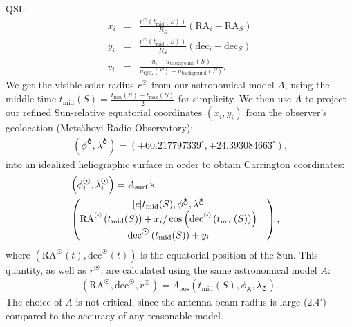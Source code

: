 \documentclass{aa}
\newcommand{\arrc}[1]{\begin{matrix}[c] #1 \end{matrix}}
\newcommand{\eqnl}[2]{\begin{eqnarray}\label{#1}#2\end{eqnarray}}
\newcommand{\s}[2]{{#1}_{\mathrm{#2}}}
\begin{document}
QSL:
\eqnl{calibration}{
x_i &=& \frac{r^{\astrosun} \left( \s{t}{mid}(S) \right)}{R_S} \left( \mathrm{RA}_i -  \mathrm{RA}_S  \right) \\
y_i &=& \frac{r^{\astrosun} \left( \s{t}{mid}(S) \right)}{R_S} \left( \mathrm{dec}_i - \mathrm{dec}_S \right) \\
v_i &=& \frac{u_i - \s{u}{background}(S)}{\s{u}{QSL}(S) - \s{u}{background}(S)} \text{.}
}
We get the visible solar radius $r^{\astrosun}$ from our astronomical model $A$, using the middle time $\s{t}{mid}(S) = 
\frac{\s{t}{min}(S) + \s{t}{max}(S)}{2}$ for simplicity. We then use $A$ to project our refined Sun-relative equatorial coordinates $(x_i,y_i)$ 
from the observer's geolocation (Metsähovi Radio Observatory):
\eqnl{mro_geolocation}{
(\phi^{\earth}, \lambda^{\earth}) = \left( +60.217797339^{\circ}, +24.393084663^{\circ} 
\right) \text{,}}
into an idealized heliographic surface 
in order to obtain Carrington coordinates:
\eqnl{carrington_coordinates}{
&\left( \phi^{\astrosun}_i, 
\lambda^{\astrosun}_i \right) = A_{\rm surf} \times& \\
&\left( \arrc{\s{t}{mid}(S), \phi^{\earth}, \lambda^{\earth}
\\
\mathrm{RA}^{\astrosun} \left( \s{t}{mid}(S) \right) + x_i / \cos \left( \mathrm{dec}^{\astrosun} \left( \s{t}{mid}(S) \right) \right)&
\\
\mathrm{dec}^{\astrosun} \left( \s{t}{mid}(S) \right) + y_i} \right) \nonumber 
\text{,}
}
where $\left( \mathrm{RA}^{\astrosun}(t), \mathrm{dec}^{\astrosun}(t) \right)$ is the equatorial position of the Sun. This quantity, as well as $r^{\astrosun}$, are calculated using the same astronomical model $A$:
\eqnl{astromodel}{
\left( \mathrm{RA}^{\astrosun}, \mathrm{dec}^{\astrosun}, r^{\astrosun} \right) = \s{A}{pos} \left( \s{t}{mid}(S), \phi_{\earth}, \lambda_{\earth} \right) \text{.}
}
The choice of $A$ is not critical, since the antenna beam radius is large ($2.4 \prime$) compared to the accuracy of any 
reasonable model.
\end{document}
